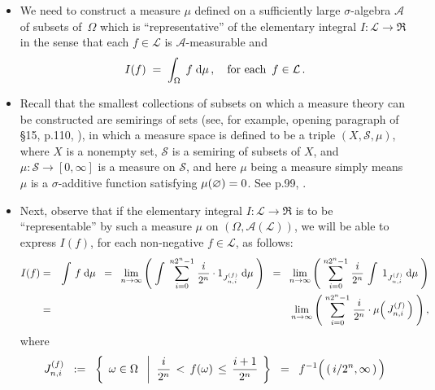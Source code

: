 \vskip 0.5cm
\proofoutline
\begin{itemize}
\item
	We need to construct a measure $\mu$ defined on a sufficiently large
	$\sigma$-algebra $\mathcal{A}$ of subsets of \,$\Omega$
	which is ``representative'' of the elementary integral
	$I : \mathcal{L} \longrightarrow \Re$ in the sense that each $f \in \mathcal{L}$
	is $\mathcal{A}$-measurable and
	\begin{equation*}
	I(f) \; = \; \int_{\Omega}\; f \;\textnormal{d}\mu\,,
	\quad\textnormal{for each \,$f \in \mathcal{L}$}\,.
	\end{equation*}
\item
	Recall that the smallest collections of subsets on which a measure theory can be constructed
	are {\color{red}semirings} of sets (see, for example, opening paragraph of \S15, p.110, \cite{Aliprantis1998}),
	in which a measure space is defined to be a triple $(X,\mathcal{S},\mu)$, where
	$X$ is a nonempty set, $\mathcal{S}$ is a semiring of subsets of $X$, and
	$\mu:\mathcal{S}\longrightarrow [0,\infty]$ is a measure on $\mathcal{S}$,
	and here $\mu$ being a measure simply means $\mu$ is a $\sigma$-additive function
	satisfying $\mu(\varnothing) = 0$. See p.99, \cite{Aliprantis1998}.
\item
	Next, observe that if the elementary integral $I : \mathcal{L} \longrightarrow \Re$
	is to be ``representable'' by such a measure $\mu$ on $(\Omega,\mathcal{A}(\mathcal{L}))$,
	we will be able to express $I(f)$, for each non-negative $f \in \mathcal{L}$, as follows:
	\begin{eqnarray*}
	I(f)
	& = &
		\int\, f \;\textnormal{d}\mu
	\;\; = \;\;
		\underset{n\rightarrow\infty}{\lim}
		\left(\;
			\int\;
			\overset{n2^{n}-1}{\underset{i=0}{\sum}}\; \dfrac{i}{2^{n}} \cdot 1_{J^{(f)}_{n,i}}
			\;\textnormal{d}\mu
		\;\right)
	\;\; = \;\;
		\underset{n\rightarrow\infty}{\lim}
		\left(\;
			\overset{n2^{n}-1}{\underset{i=0}{\sum}}\; \dfrac{i}{2^{n}}\,
			\int\; 1_{J^{(f)}_{n,i}} \;\textnormal{d}\mu
		\;\right)
	\\
	& = &
		\underset{n\rightarrow\infty}{\lim}
		\left(\;
			\overset{n2^{n}-1}{\underset{i=0}{\sum}}\; \dfrac{i}{2^{n}} \cdot \mu\!\left(\,J^{(f)}_{n,i}\,\right)
		\;\right),
	\end{eqnarray*}
	where
	\begin{equation*}
	J^{(f)}_{n,i}
	\;\; := \;\;
		\left\{\;\,
			\omega \in \Omega
		\;\;\left\vert\;\;
			\dfrac{i}{2^{n}} \,<\, f(\omega) \,\leq\, \dfrac{i+1}{2^{n}}
		\right.
		\;\right\}
	\;\; = \;\;
		f^{-1}\!\left(\,(\,i/2^{n}\overset{{\color{white}\vert}}{,}\,\infty\,)\,\right)

\end{equation*}
\end{itemize}
